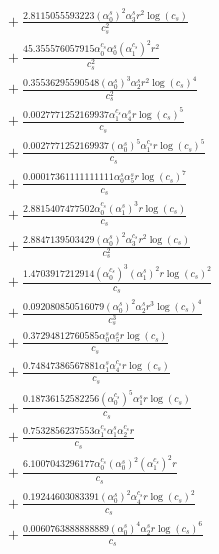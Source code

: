 \documentclass[10pt]{article}
\begin{document}
\begin{align*}
&{}  + \frac{2.8115055593223 \left(\alpha_{0}^s\right)^{2} \alpha_{3}^s r^{2} \log{\left(c_{s} \right)}}{c_{s}^{2}} \\
&{}  + \frac{45.355576057915 \alpha_{0}^{c_s} \alpha_{0}^s \left(\alpha_{1}^{c_s}\right)^{2} r^{2}}{c_{s}^{2}} \\
&{}  + \frac{0.35536295590548 \left(\alpha_{0}^s\right)^{3} \alpha_{2}^s r^{2} \log{\left(c_{s} \right)}^{4}}{c_{s}^{2}} \\
&{}  + \frac{0.0027771252169937 \alpha_{1}^{c_s} \alpha_{4}^s r \log{\left(c_{s} \right)}^{5}}{c_{s}} \\
&{}  + \frac{0.0027771252169937 \left(\alpha_{0}^s\right)^{5} \alpha_{1}^{c_s} r \log{\left(c_{s} \right)}^{5}}{c_{s}} \\
&{}  + \frac{0.00017361111111111 \alpha_{0}^s \alpha_{5}^s r \log{\left(c_{s} \right)}^{7}}{c_{s}} \\
&{}  + \frac{2.8815407477502 \alpha_{0}^{c_s} \left(\alpha_{1}^s\right)^{3} r \log{\left(c_{s} \right)}}{c_{s}} \\
&{}  + \frac{2.8847139503429 \left(\alpha_{0}^s\right)^{2} \alpha_{3}^{c_s} r^{2} \log{\left(c_{s} \right)}}{c_{s}^{2}} \\
&{}  + \frac{1.4703917212914 \left(\alpha_{0}^{c_s}\right)^{3} \left(\alpha_{1}^s\right)^{2} r \log{\left(c_{s} \right)}^{2}}{c_{s}} \\
&{}  + \frac{0.092080850516079 \left(\alpha_{0}^s\right)^{2} \alpha_{2}^s r^{3} \log{\left(c_{s} \right)}^{4}}{c_{s}^{3}} \\
&{}  + \frac{0.37294812760585 \alpha_{0}^s \alpha_{5}^s r \log{\left(c_{s} \right)}}{c_{s}} \\
&{}  + \frac{0.74847386567881 \alpha_{1}^s \alpha_{4}^{c_s} r \log{\left(c_{s} \right)}}{c_{s}} \\
&{}  + \frac{0.18736152582256 \left(\alpha_{0}^{c_s}\right)^{5} \alpha_{1}^s r \log{\left(c_{s} \right)}}{c_{s}} \\
&{}  + \frac{0.7532856237553 \alpha_{1}^{c_s} \alpha_{1}^s \alpha_{2}^{c_s} r}{c_{s}} \\
&{}  + \frac{6.1007043296177 \alpha_{0}^{c_s} \left(\alpha_{0}^s\right)^{2} \left(\alpha_{1}^{c_s}\right)^{2} r}{c_{s}} \\
&{}  + \frac{0.19244603083391 \left(\alpha_{0}^s\right)^{2} \alpha_{4}^{c_s} r \log{\left(c_{s} \right)}^{2}}{c_{s}} \\
&{}  + \frac{0.0060763888888889 \left(\alpha_{0}^s\right)^{4} \alpha_{2}^s r \log{\left(c_{s} \right)}^{6}}{c_{s}} \\

\end{align*}
\end{document}
